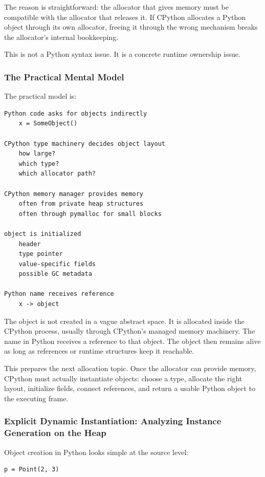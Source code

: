 The reason is straightforward: the allocator that gives memory must be compatible with the allocator that releases it. If CPython allocates a Python object through its own allocator, freeing it through the wrong mechanism breaks the allocator's internal bookkeeping.

This is not a Python syntax issue. It is a concrete runtime ownership issue.

\subsubsection*{The Practical Mental Model}

The practical model is:

\begin{verbatim}
Python code asks for objects indirectly
    x = SomeObject()

CPython type machinery decides object layout
    how large?
    which type?
    which allocator path?

CPython memory manager provides memory
    often from private heap structures
    often through pymalloc for small blocks

object is initialized
    header
    type pointer
    value-specific fields
    possible GC metadata

Python name receives reference
    x -> object
\end{verbatim}

The object is not created in a vague abstract space. It is allocated inside the CPython process, usually through CPython's managed memory machinery. The name in Python receives a reference to that object. The object then remains alive as long as references or runtime structures keep it reachable.

This prepares the next allocation topic. Once the allocator can provide memory, CPython must actually instantiate objects: choose a type, allocate the right layout, initialize fields, connect references, and return a usable Python object to the executing frame.


\subsubsection{Explicit Dynamic Instantiation: Analyzing Instance Generation on the Heap}

Object creation in Python looks simple at the source level:

\begin{verbatim}
p = Point(2, 3)
\end{verbatim}

